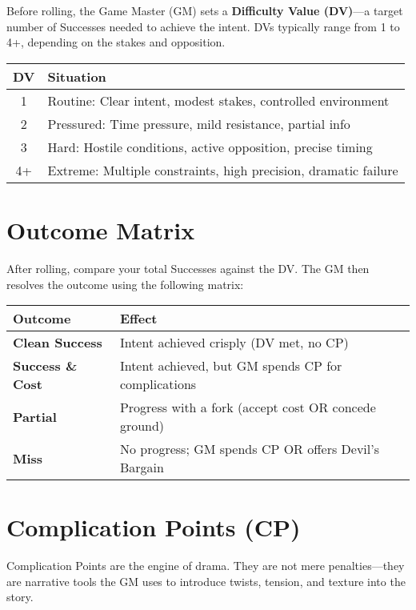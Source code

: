 Before rolling, the Game Master (GM) sets a \textbf{Difficulty Value (DV)}—a target number of Successes needed to achieve the intent. DVs typically range from 1 to 4+, depending on the stakes and opposition.

\begin{center}
\begin{tabular}{cl}
\toprule
\textbf{DV} & \textbf{Situation} \\
\midrule
1 & Routine: Clear intent, modest stakes, controlled environment \\
2 & Pressured: Time pressure, mild resistance, partial info \\
3 & Hard: Hostile conditions, active opposition, precise timing \\
4+ & Extreme: Multiple constraints, high precision, dramatic failure \\
\bottomrule
\end{tabular}
\end{center}

\section{Outcome Matrix}

After rolling, compare your total Successes against the DV. The GM then resolves the outcome using the following matrix:

\begin{center}
\begin{tabular}{ll}
\toprule
\textbf{Outcome} & \textbf{Effect} \\
\midrule
\textbf{Clean Success} & Intent achieved crisply (DV met, no CP) \\
\textbf{Success \& Cost} & Intent achieved, but GM spends CP for complications \\
\textbf{Partial} & Progress with a fork (accept cost OR concede ground) \\
\textbf{Miss} & No progress; GM spends CP OR offers Devil's Bargain \\
\bottomrule
\end{tabular}
\end{center}

\section{Complication Points (CP)}

Complication Points are the engine of drama. They are not mere penalties—they are narrative tools the GM uses to introduce twists, tension, and texture into the story.

